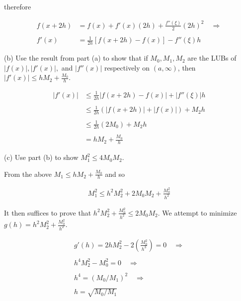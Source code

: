 \documentclass{article}
\begin{document}
  therefore

  \begin{align*}
    f(x+2h)&=f(x)+f'(x)(2h) + \frac{f''(\xi)}{2}(2h)^2 \quad \Rightarrow \\\\
    f'(x) &= \frac{1}{2h}[f(x+2h)-f(x)]-f''(\xi)h
  \end{align*}

  \vspace{1cm}

  {\Large \color{Sepia} (b) Use the result from part (a) to show that if $M_0,M_1,M_2$ are the LUBs of $|f(x)|,|f'(x)|,$ and $|f''(x)|$ respectively on $(a,\infty)$, then $|f'(x)|\leq hM_2+\frac{M_0}{h}$.}

  \vspace{1cm}

  \begin{align*}
    |f'(x)| &\leq \frac{1}{2h}  |f(x+2h)-f(x)|+ |f''(\xi)|h \\\\
    &\leq \frac{1}{2h}(|f(x+2h)|+|f(x)|)+M_2h \\\\
    &\leq \frac{1}{2h}(2M_0)+M_2h \\\\
    &= hM_2+\frac{M_0}{h}
  \end{align*}

  \vspace{1cm}

  {\Large \color{Sepia} (c) Use part (b) to show $M_1^2\leq 4M_0M_2$.}

  \vspace{1cm}

  From the above $M_1\leq hM_2+\frac{M_0}{h}$ and so

  \begin{align*}
    M_1^2\leq h^2M_2^2+2M_0M_2+\frac{M_0^2}{h^2}
  \end{align*}

  It then suffices to prove that $h^2M_2^2+\frac{M_0^2}{h^2}\leq 2M_0M_2$.  We attempt to minimize $g(h)=h^2M_2^2+\frac{M_0^2}{h^2}$.

  \begin{align*}
    g'(h) = 2hM_2^2-2\left(\frac{M_0^2}{h^3}\right) = 0 \quad \Rightarrow \\\\
    h^4M_2^2-M_0^2 = 0 \quad \Rightarrow \\\\
    h^4 = (M_0/M_1)^2 \quad \Rightarrow \\\\
    h = \sqrt{M_0/M_1}
  \end{align*}
\end{document}
